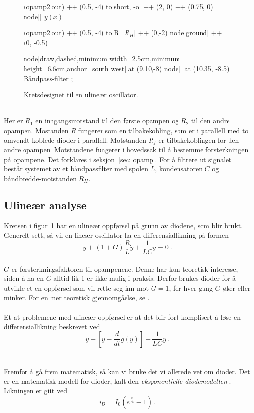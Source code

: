 \documentclass[a4paper,11pt,norsk]{article}
\begin{document}
\begin{figure}[htbp]
\begin{circuitikz} [american voltages, european resistors, european vresistors, baseline=(current bounding box.center)]
        (opamp2.out) ++ (0.5, -4)
        to[short, -o] ++ (2, 0)
        ++ (0.75, 0) node[] {$y(x)$}
        
        (opamp2.out) ++ (0.5, -4)
        to[R=$R_H$] ++ (0,-2)
        node[ground] ++ (0, -0.5)
        
        node[draw,dashed,minimum width=2.5cm,minimum height=6.6cm,anchor=south west] at (9.10,-8) {}
        node[] at (10.35, -8.5) {Båndpass-filter}
        ;
        
    \end{circuitikz}
    \caption{Kretsdesignet til en ulineær oscillator.}
    \label{fig: oscillator kretsdesign}
\end{figure} \\
Her er $R_1$ en inngangsmotstand til den første opampen og $R_2$ til den andre opampen. Mostanden $R$ fungerer som en tilbakekobling, som er i parallell med to omvendt koblede dioder i parallell. Motstanden $R_f$ er tilbakekoblingen for den andre opampen. Motstandene fungerer i hovedssak til å bestemme forsterkningen på opampene. Det forklares i seksjon~\ref{sec: opamp}. For å filtrere ut signalet består systemet av et båndpassfilter med spolen $L$, kondensatoren $C$ og båndbredde-motstanden $R_H$.
\newpage
\subsection{Ulineær analyse}
Kretsen i figur~\ref{fig: oscillator kretsdesign} har en ulineær oppførsel på grunn av diodene, som blir brukt. Generelt sett, så vil en lineær oscillator ha en differensiallikning på formen 
\\
\begin{equation}
    \ddot{y} + (1 + G) \frac{R}{L}\dot{y} + \frac{1}{LC}y = 0 \: .
\end{equation}
\\
$G$ er forsterkningsfaktoren til opampenene. Denne har kun teoretisk interesse, siden å ha en $G$ alltid lik 1 er ikke mulig i praksis. Derfor brukes dioder for å utvikle et en oppførsel som vil rette seg inn mot $G = 1$, for hver gang $G$ øker eller minker. For en mer teoretisk gjennomgåelse, se \cite{Oscillator bb}. \\\\ Et at problemene med ulineær oppførsel er at det blir fort komplisert å løse en differensiallikning beskrevet ved 
\begin{equation}
    \ddot{y} + \left[ \dot{y} - \frac{d}{dt} g(y)  \right] + \frac{1}{LC}y \: .
\end{equation}
\\\\
Fremfor å gå frem matematisk, så kan vi bruke det vi allerede vet om dioder. Det er en matematisk modell for dioder, kalt den \textit{eksponentielle diodemodellen} \cite{diode modell}. Likningen er gitt ved 
\begin{equation}
    i_D = I_0 \left( e^\frac{v}{V_0} - 1 \right) \: .
\end{equation}
\\
\end{document}
